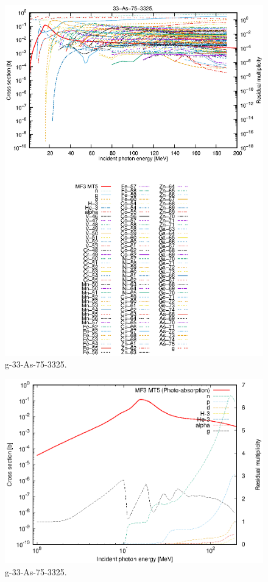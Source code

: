 \begin{figure}
 \includegraphics[width=\linewidth]{eps/g_33-As-75_3325.eps}
  \caption{g-33-As-75-3325.}
\end{figure}
\newpage \clearpage

\begin{figure}
 \includegraphics[width=\linewidth]{eps-log/g_33-As-75_3325.eps}
 \caption{g-33-As-75-3325.}
\end{figure}
\newpage \clearpage

